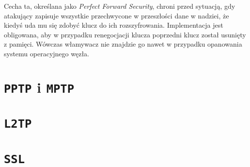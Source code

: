 \documentclass{article}
\begin{document}
Cecha ta, określana jako \emph{Perfect Forward Security}, chroni przed sytuacją, gdy atakujący zapisuje wszystkie przechwycone w przeszłości dane w nadziei, że kiedyś uda mu się zdobyć klucz do ich rozszyfrowania.
Implementacja jest obligowana, aby w przypadku renegocjacji klucza poprzedni klucz został usunięty z pamięci.
Wówczas włamywacz nie znajdzie go nawet w przypadku opanowania systemu operacyjnego węzła.
\section{{\tt PPTP} i {\tt MPTP}}
\section{\tt L2TP}
\section{\tt SSL}
\end{document}
